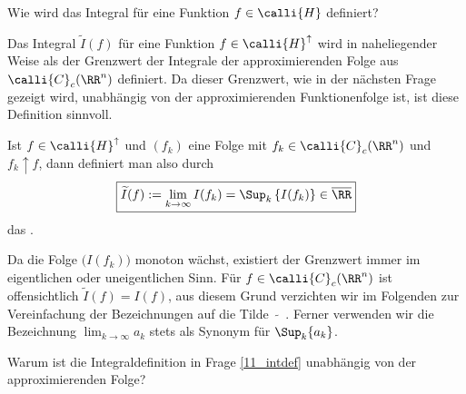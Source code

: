 \begin{frage}\label{11_intdef}
  Wie wird das Integral f\"ur eine Funktion $f\in\calli{H}$ 
  definiert?                                             
\end{frage}

\begin{antwort}
  Das Integral $\widetilde{I}(f)$ für eine Funktion 
  $f\in\calli{H}^\uparrow$ wird in naheliegender Weise als der Grenzwert der
  Integrale der approximierenden Folge aus $\calli{C}_c(\RR^n)$ definiert. 
  Da dieser Grenzwert, wie in der nächsten Frage gezeigt wird, unabhängig 
  von der approximierenden Funktionenfolge ist, ist diese Definition sinnvoll. 

  Ist $f\in \calli{H}^{\uparrow}$ und $(f_k)$ eine Folge mit 
  $f_k \in \calli{C}_c(\RR^n)$ und $f_k \uparrow f$, dann definiert man 
  also durch  
  \[
  \boxed{
    \widetilde{I}(f) := \lim_{k\to\infty} I(f_k) = 
    \Sup_k \,\{ I(f_k) \} \in \overline{\RR} 
  }
  \]
  das . 

  Da die Folge $\big( I(f_k) \big)$ monoton 
  wächst, existiert der Grenzwert immer im 
  eigentlichen oder uneigentlichen Sinn. 
  F\"ur $f\in \calli{C}_c(\RR^n)$ ist offensichtlich $\widetilde{I}(f)=I(f)$, 
  aus diesem Grund 
  verzichten wir im Folgenden zur Vereinfachung der Bezeichnungen auf 
  die Tilde $\widetilde{\quad}$. Ferner verwenden wir die Bezeichnung 
  $\lim_{k\to\infty} a_k$ stets als Synonym für $\Sup_k \{ a_k \}$. 
  \AntEnd
\end{antwort}

\begin{frage}
  Warum ist die Integraldefinition in Frage 
  \ref{11_intdef} unabh\"angig von der approximierenden Folge?
\end{frage}

